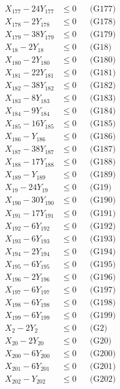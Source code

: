 \documentclass[a4paper,10pt]{article}
\begin{document}
{\begin{align}
X_{177} - 24Y_{177} &\leq 0 && \text{(G177)} \\
X_{178} - 2Y_{178} &\leq 0 && \text{(G178)} \\
X_{179} - 38Y_{179} &\leq 0 && \text{(G179)} \\
X_{18} - 2Y_{18} &\leq 0 && \text{(G18)} \\
X_{180} - 2Y_{180} &\leq 0 && \text{(G180)} \\
X_{181} - 22Y_{181} &\leq 0 && \text{(G181)} \\
X_{182} - 38Y_{182} &\leq 0 && \text{(G182)} \\
X_{183} - 8Y_{183} &\leq 0 && \text{(G183)} \\
X_{184} - 9Y_{184} &\leq 0 && \text{(G184)} \\
X_{185} - 16Y_{185} &\leq 0 && \text{(G185)} \\
X_{186} - Y_{186} &\leq 0 && \text{(G186)} \\
X_{187} - 38Y_{187} &\leq 0 && \text{(G187)} \\
X_{188} - 17Y_{188} &\leq 0 && \text{(G188)} \\
\allowbreak
X_{189} - Y_{189} &\leq 0 && \text{(G189)} \\
X_{19} - 24Y_{19} &\leq 0 && \text{(G19)} \\
X_{190} - 30Y_{190} &\leq 0 && \text{(G190)} \\
X_{191} - 17Y_{191} &\leq 0 && \text{(G191)} \\
X_{192} - 6Y_{192} &\leq 0 && \text{(G192)} \\
X_{193} - 6Y_{193} &\leq 0 && \text{(G193)} \\
X_{194} - 2Y_{194} &\leq 0 && \text{(G194)} \\
X_{195} - 6Y_{195} &\leq 0 && \text{(G195)} \\
X_{196} - 2Y_{196} &\leq 0 && \text{(G196)} \\
X_{197} - 6Y_{197} &\leq 0 && \text{(G197)} \\
X_{198} - 6Y_{198} &\leq 0 && \text{(G198)} \\
X_{199} - 6Y_{199} &\leq 0 && \text{(G199)} \\
X_{2} - 2Y_{2} &\leq 0 && \text{(G2)} \\
X_{20} - 2Y_{20} &\leq 0 && \text{(G20)} \\
X_{200} - 6Y_{200} &\leq 0 && \text{(G200)} \\
X_{201} - 6Y_{201} &\leq 0 && \text{(G201)} \\
X_{202} - Y_{202} &\leq 0 && \text{(G202)} \\

\end{align}}
\end{document}
